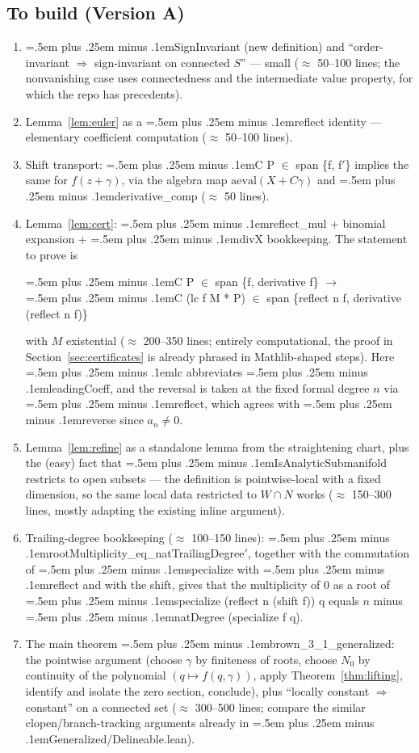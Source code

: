 \documentclass[11pt,a4paper]{article}
\theoremstyle{definition}
\newcommand{\code}[1]{{\ttfamily\spaceskip=.5em plus .25em minus .1em\relax #1}}
\begin{document}
\subsection*{To build (Version A)}

\begin{enumerate}[leftmargin=2em]
\item \code{SignInvariant} (new definition) and ``order-invariant
  $\Rightarrow$ sign-invariant on connected $S$'' --- small
  ($\approx$ 50--100 lines; the nonvanishing case uses connectedness and the
  intermediate value property, for which the repo has precedents).
\item Lemma~\ref{lem:euler} as a \code{reflect} identity --- elementary
  coefficient computation ($\approx$ 50--100 lines).
\item Shift transport: \code{C P $\in$ span \{f, f$'$\}} implies the same for
  $f(z+\gamma)$, via the algebra map $\mathrm{aeval}(X + C\gamma)$ and
  \code{derivative\_comp} ($\approx$ 50 lines).
\item Lemma~\ref{lem:cert}: \code{reflect\_mul} + binomial expansion +
  \code{divX} bookkeeping. The statement to prove is
  \begin{center}
    \code{C P $\in$ span \{f, derivative f\} $\to$}\\
    \code{C (lc f  M * P) $\in$ span \{reflect n f, derivative (reflect n f)\}}
  \end{center}
  with $M$ existential ($\approx$ 200--350 lines; entirely computational, the
  proof in Section~\ref{sec:certificates} is already phrased in Mathlib-shaped
  steps). Here \code{lc} abbreviates \code{leadingCoeff}, and the reversal is
  taken at the fixed formal degree $n$ via \code{reflect}, which agrees with
  \code{reverse} since $a_n \neq 0$.
\item Lemma~\ref{lem:refine} as a standalone lemma from the straightening
  chart, plus the (easy) fact that \code{IsAnalyticSubmanifold} restricts to
  open subsets --- the definition is pointwise-local with a fixed dimension,
  so the same local data restricted to $W \cap N$ works
  ($\approx$ 150--300 lines, mostly adapting the existing inline argument).
\item {\sloppy Trailing-degree bookkeeping ($\approx$ 100--150 lines):
  \code{rootMultiplicity\_eq\_\allowbreak natTrailingDegree$'$}, together with the
  commutation of \code{specialize} with \code{reflect} and with the shift,
  gives that the multiplicity of $0$ as a root of
  \code{specialize (reflect n (shift f)) q} equals
  $n$ minus \code{natDegree (specialize f q)}.\par}
\item The main theorem \code{brown\_3\_1\_generalized}: the pointwise argument
  (choose $\gamma$ by finiteness of roots, choose $N_0$ by continuity of the
  polynomial $(q \mapsto f(q,\gamma))$, apply Theorem~\ref{thm:lifting},
  identify and isolate the zero section, conclude), plus
  ``locally constant $\Rightarrow$ constant'' on a connected set
  ($\approx$ 300--500 lines; compare the similar clopen/branch-tracking
  arguments already in \code{Generalized/Delineable.lean}).
\end{enumerate}
\end{document}
